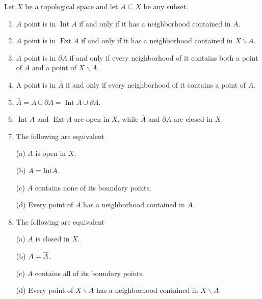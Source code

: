 \begin{proposition}
     Let $X$ be a topological space and let $A \subseteq X$ be any subset.
     \begin{enumerate}[label=(\arabic*)]
        \item $A$ point is in $\operatorname{Int} A$ if and only if it has a neighborhood contained in $A$.
        \item $A$ point is in $\operatorname{Ext} A$ if and only if it has a neighborhood contained in $X \backslash A$.
        \item $A$ point is in $\partial A$ if and only if every neighborhood of it contains both a point of $A$ and a point of $X \backslash A$.
        \item A point is in $\bar{A}$ if and only if every neighborhood of it contains a point of $A$.
        \item $\bar{A}=A \cup \partial A=\operatorname{Int} A \cup \partial A$.
        \item $\operatorname{Int} A$ and $\operatorname{Ext} A$ are open in $X$, while $\bar{A}$ and $\partial A$ are closed in $X$.
        \item The following are equivalent
        
             (a) $A$ is open in $X$.

             (b) $A = \mathrm{Int}{A}$.

             (c) $A$ contains none of its boundary points.

             (d) Every point of $A$ has a neighborhood contained in $A$.
         \item The following are equivalent
        
             (a) $A$ is closed in $X$.

             (b) $A = \overline{A}$.

             (c) $A$ contains all of its boundary points.

             (d) Every point of $X \backslash A$ has a neighborhood contained in $X \backslash A$.
     \end{enumerate}
\end{proposition}
